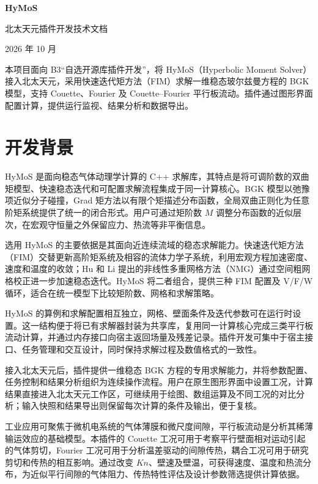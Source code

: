 \documentclass[UTF8,a4paper,11pt,fontset=fandol]{ctexart}
\newcommand{\Kn}{\mathit{Kn}}
\begin{document}
\pagestyle{plain}
\begin{center}
{\LARGE\bfseries HyMoS\par}
\vspace{0.5em}
{\large 北太天元插件开发技术文档\par}
\vspace{0.6em}
{\small  2026 年 10 月}
\end{center}
\noindent 本项目面向 B3“自选开源库插件开发”，将 HyMoS（Hyperbolic Moment Solver）接入北太天元，采用快速迭代矩方法（FIM）求解一维稳态玻尔兹曼方程的 BGK 模型，支持 Couette、Fourier 及 Couette--Fourier 平行板流动。插件通过图形界面配置计算，提供运行监视、结果分析和数据导出。

\section{开发背景}
HyMoS 是面向稳态气体动理学计算的 C++ 求解库，其特点是将可调阶数的双曲矩模型、快速稳态迭代和可配置求解流程集成于同一计算核心。BGK 模型以弛豫项近似分子碰撞\cite{bgk1954}，Grad 矩方法以有限个矩描述分布函数\cite{grad1949}，全局双曲正则化为任意阶矩系统提供了统一的闭合形式\cite{cai2014}。用户可通过矩阶数 $M$ 调整分布函数的近似层次，在宏观守恒量之外保留应力、热流等非平衡信息。

选用 HyMoS 的主要依据是其面向近连续流域的稳态求解能力。快速迭代矩方法（FIM）交替更新高阶矩系统及相容的流体力学子系统，利用宏观方程加速密度、速度和温度的收敛\cite{li2026}；Hu 和 Li 提出的非线性多重网格方法（NMG）通过空间粗网格校正进一步加速稳态迭代\cite{hu2014}。HyMoS 将二者组合，提供三种 FIM 配置及 V/F/W 循环，适合在统一模型下比较矩阶数、网格和求解策略。

HyMoS 的算例和求解配置相互独立，网格、壁面条件及迭代参数可在运行时设置。这一结构便于将已有求解器封装为共享库，复用同一计算核心完成三类平行板流动计算，并通过内存接口向宿主返回场量及残差记录。插件开发可集中于宿主接口、任务管理和交互设计，同时保持求解过程及数值格式的一致性。

接入北太天元后，插件提供一维稳态 BGK 方程的专用求解能力，并将参数配置、任务控制和结果分析组织为连续操作流程。用户在原生图形界面中设置工况，计算结果直接进入北太天元工作区，可继续用于绘图、数组运算及不同工况的对比分析；输入快照和结果导出则保留每次计算的条件及输出，便于复核。

工业应用可聚焦于微机电系统的气体薄膜和微尺度间隙，平行板流动是分析其稀薄输运效应的基础模型\cite{cercignani2006}。本插件的 Couette 工况可用于考察平行壁面相对运动引起的气体剪切，Fourier 工况可用于分析温差驱动的间隙传热，耦合工况可用于研究剪切和传热的相互影响。通过改变 $\Kn$、壁速及壁温，可获得速度、温度和热流分布，为近似平行间隙的气体阻力、传热特性评估及设计参数筛选提供计算依据。
\end{document}
